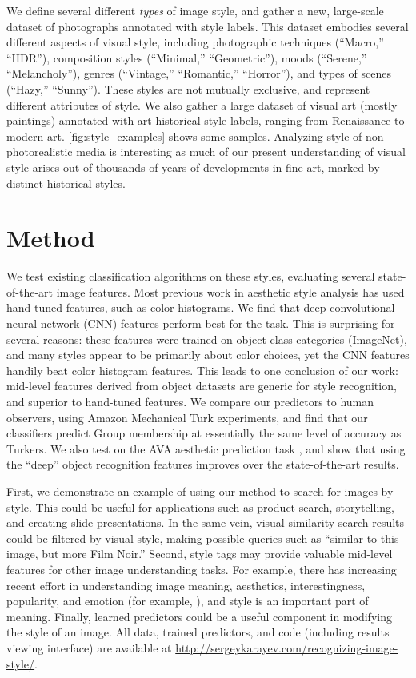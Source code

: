 We define several different \textit{types} of image style, and gather a new, large-scale dataset of photographs annotated with style labels.
This dataset embodies several different aspects of visual style, including photographic techniques  (``Macro,'' ``HDR''), composition styles (``Minimal,'' ``Geometric''), moods (``Serene,'' ``Melancholy''), genres (``Vintage,'' ``Romantic,'' ``Horror''), and types of scenes (``Hazy,'' ``Sunny'').
These styles are not mutually exclusive, and represent different attributes of style.
We also gather a large dataset of visual art (mostly paintings) annotated with art historical style labels, ranging from Renaissance to modern art.
\autoref{fig:style_examples} shows some samples.
Analyzing style of non-photorealistic media is interesting as much of our present understanding of visual style arises out of thousands of years of developments in fine art, marked by distinct historical styles.

\section{Method}\label{sec:style_method}

We test existing classification algorithms on these styles, evaluating several state-of-the-art image features.
Most previous work in aesthetic style analysis has  used hand-tuned features, such as color histograms.
We find that deep convolutional neural network (CNN) features perform best for the task.
This is surprising for several reasons: these features were trained on object class categories (ImageNet), and many styles appear to be primarily about color choices, yet the CNN features handily beat color histogram features.
This leads to one conclusion of our work: mid-level features derived from object datasets are generic for style recognition, and superior to hand-tuned features.
We compare our predictors to human observers, using Amazon Mechanical Turk experiments, and find that our classifiers predict Group membership at essentially the same level of accuracy as Turkers.
We also test on the AVA aesthetic prediction task \parencite{Murray-CVPR-2012}, and show that using the ``deep'' object recognition features improves over the state-of-the-art results.

First, we demonstrate an example of using our method to search for images by style.
This could be useful for applications such as product search, storytelling, and creating slide presentations.
In the same vein, visual similarity search results could be filtered by visual style, making possible queries such as ``similar to this image, but more Film Noir.''
Second, style tags may provide valuable mid-level features for other image understanding tasks.
For example, there has increasing recent effort in understanding image meaning, aesthetics, interestingness, popularity, and emotion (for example, \parencite{Gygli-ICCV-2013,Isola-CVPR-2011,joo2014,khosla2014}), and style is an important part of meaning.
Finally, learned predictors could be a useful component in modifying the style of an image.
All data, trained predictors, and code (including results viewing interface) are available at \url{http://sergeykarayev.com/recognizing-image-style/}.

